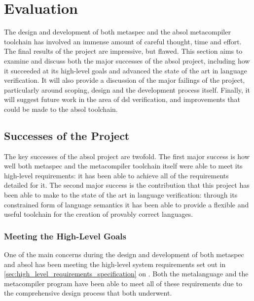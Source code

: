 \chapter{Evaluation} %
\label{cha:evaluation}
The design and development of both \gls{metaspec} and the \gls{absol} metacompiler toolchain has involved an immense amount of careful thought, time and effort.
The final results of the project are impressive, but flawed.
This section aims to examine and discuss both the major successes of the \gls{absol} project, including how it succeeded at its high-level goals and advanced the state of the art in language verification.
It will also provide a discussion of the major failings of the project, particularly around scoping, design and the development process itself.
Finally, it will suggest future work in the area of \gls{dsl} verification, and improvements that could be made to the \gls{absol} toolchain.

\section{Successes of the Project} %
\label{sec:successes_of_the_project}
The key successes of the \gls{absol} project are twofold. 
The first major success is how well both \gls{metaspec} and the metacompiler toolchain itself were able to meet its high-level requirements: it has been able to achieve all of the requirements detailed for it.
The second major success is the contribution that this project has been able to make to the state of the art in language verification: through its constrained form of language semantics it has been able to provide a flexible and useful toolchain for the creation of provably correct languages. 

\subsection{Meeting the High-Level Goals} %
\label{sub:meeting_the_high_level_goals}
One of the main concerns during the design and development of both \gls{metaspec} and \gls{absol} has been meeting the high-level system requirements set out in \autoref{sec:high_level_requirements_specification} on . 
Both the metalanguage and the metacompiler program have been able to meet all of these requirements due to the comprehensive design process that both underwent. \\

